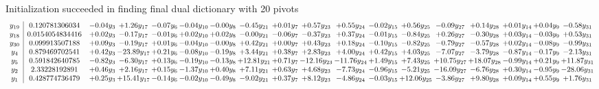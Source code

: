 \documentclass[9pt]{article}
\begin{document}
Initialization succeeded in finding final dual dictionary with 20 pivots
\[\begin{array}{c| c c@{\hskip 2pt} c@{\hskip 2pt} c@{\hskip 2pt} c@{\hskip 2pt} c@{\hskip 2pt} c@{\hskip 2pt} c@{\hskip 2pt} c@{\hskip 2pt} c@{\hskip 2pt} c@{\hskip 2pt} c@{\hskip 2pt} c@{\hskip 2pt} c@{\hskip 2pt} c@{\hskip 2pt} c@{\hskip 2pt} c@{\hskip 2pt} }
 y_{19}   &  0.120781306034 & -0.04 y_{3} & +  1.26 y_{17} & -0.07 y_{6} & -0.04 y_{10} & -0.00 y_{8} & -0.45 y_{21} & +  0.01 y_{7} & +  0.57 y_{23} & +  0.55 y_{24} & -0.02 y_{15} & +  0.56 y_{25} & -0.09 y_{27} & +  0.14 y_{28} & +  0.01 y_{14} & +  0.04 y_{9} & -0.58 y_{31}\\
 y_{18}   &  0.0154054834416 & +  0.02 y_{3} & -0.17 y_{17} & -0.01 y_{6} & +  0.02 y_{10} & +  0.02 y_{8} & -0.00 y_{21} & -0.06 y_{7} & -0.37 y_{23} & +  0.37 y_{24} & -0.01 y_{15} & -0.84 y_{25} & +  0.26 y_{27} & -0.30 y_{28} & +  0.03 y_{14} & -0.03 y_{9} & +  0.53 y_{31}\\
 y_{30}   &  0.099913507188 & +  0.09 y_{3} & -0.19 y_{17} & +  0.01 y_{6} & -0.04 y_{10} & -0.00 y_{8} & +  0.42 y_{21} & +  0.00 y_{7} & +  0.43 y_{23} & +  0.18 y_{24} & -0.10 y_{15} & -0.82 y_{25} & -0.79 y_{27} & -0.57 y_{28} & +  0.02 y_{14} & -0.08 y_{9} & -0.99 y_{31}\\
 y_{4}   &  0.879469702541 & +  0.42 y_{3} & -23.89 y_{17} & +  0.21 y_{6} & -0.08 y_{10} & -0.19 y_{8} & +  3.44 y_{21} & +  0.38 y_{7} & +  2.83 y_{23} & +  4.00 y_{24} & +  0.42 y_{15} & +  4.03 y_{25} & -7.07 y_{27} & -3.79 y_{28} & -0.87 y_{14} & -0.17 y_{9} & -2.13 y_{31}\\
 y_{5}   &  0.591842640785 & -0.82 y_{3} & -6.30 y_{17} & +  0.13 y_{6} & -0.19 y_{10} & -0.13 y_{8} & + 12.81 y_{21} & +  0.71 y_{7} & -12.16 y_{23} & -11.76 y_{24} & +  1.49 y_{15} & +  7.43 y_{25} & + 10.75 y_{27} & + 18.07 y_{28} & -0.99 y_{14} & +  0.21 y_{9} & + 11.87 y_{31}\\
 y_{2}   &  2.33228192891 & +  0.46 y_{3} & +  2.16 y_{17} & +  0.15 y_{6} & -1.37 y_{10} & +  0.40 y_{8} & +  7.11 y_{21} & +  0.63 y_{7} & +  4.68 y_{23} & -7.73 y_{24} & -0.96 y_{15} & -5.21 y_{25} & -16.09 y_{27} & -6.76 y_{28} & +  0.30 y_{14} & -0.95 y_{9} & -28.06 y_{31}\\
 y_{1}   &  0.428774736479 & +  0.25 y_{3} & + 15.41 y_{17} & -0.14 y_{6} & -0.02 y_{10} & -0.49 y_{8} & -9.02 y_{21} & +  0.37 y_{7} & +  8.12 y_{23} & -4.86 y_{24} & -0.03 y_{15} & + 12.06 y_{25} & -3.86 y_{27} & +  9.80 y_{28} & +  0.09 y_{14} & +  0.55 y_{9} & +  1.76 y_{31}\\

\end{array}\]
\end{document}
